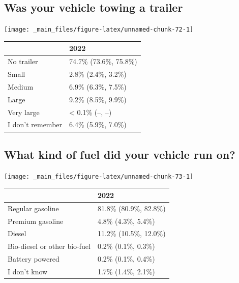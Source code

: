 \documentclass[
]{book}
\begin{document}
\hypertarget{was-your-vehicle-towing-a-trailer}{%
\subsection{Was your vehicle towing a trailer}\label{was-your-vehicle-towing-a-trailer}}

\texttt{[image: \_main\_files/figure-latex/unnamed-chunk-72-1]}

\begin{table}
\centering
\begin{tabular}[t]{>{}l|>{}l}
\hline
  & 2022\\
\hline
No trailer & 74.7\% (73.6\%, 75.8\%)\\
\hline
Small & 2.8\% (2.4\%, 3.2\%)\\
\hline
Medium & 6.9\% (6.3\%, 7.5\%)\\
\hline
Large & 9.2\% (8.5\%, 9.9\%)\\
\hline
Very large & < 0.1\% (--, --)\\
\hline
I don't remember & 6.4\% (5.9\%, 7.0\%)\\
\hline
\end{tabular}
\end{table}

\hypertarget{what-kind-of-fuel-did-your-vehicle-run-on}{%
\subsection{What kind of fuel did your vehicle run on?}\label{what-kind-of-fuel-did-your-vehicle-run-on}}

\texttt{[image: \_main\_files/figure-latex/unnamed-chunk-73-1]}

\begin{table}
\centering
\begin{tabular}[t]{>{}l|>{}l}
\hline
  & 2022\\
\hline
Regular gasoline & 81.8\% (80.9\%, 82.8\%)\\
\hline
Premium gasoline & 4.8\% (4.3\%, 5.4\%)\\
\hline
Diesel & 11.2\% (10.5\%, 12.0\%)\\
\hline
Bio-diesel or other bio-fuel & 0.2\% (0.1\%, 0.3\%)\\
\hline
Battery powered & 0.2\% (0.1\%, 0.4\%)\\
\hline
I don't know & 1.7\% (1.4\%, 2.1\%)\\
\hline
\end{tabular}
\end{table}
\end{document}

